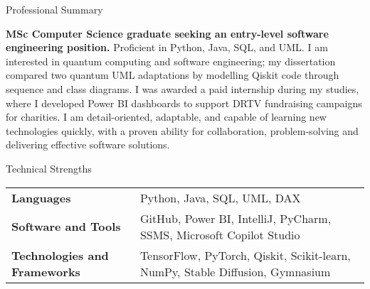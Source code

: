 \documentclass[
	11pt, %
]{resume} %
\begin{document}

\begin{rSection}{Professional Summary}

\textbf{MSc Computer Science graduate seeking an entry-level software engineering position.} Proficient in Python,
Java, SQL, and UML. I am interested in quantum computing and software engineering; my dissertation
compared two quantum UML adaptations by modelling Qiskit code through sequence and class diagrams. I was awarded a
paid internship during my studies, where I developed Power BI dashboards to support DRTV fundraising campaigns for
charities. I am detail-oriented, adaptable, and capable of learning new technologies quickly, with a proven ability
for collaboration, problem-solving and delivering effective software solutions.

\end{rSection}



\begin{rSection}{Technical Strengths}

    \begin{tabular}{@{} p{4cm} p{11cm} @{}}
        \textbf{Languages} & Python, Java, SQL, UML, DAX \\ 
        \textbf{Software and Tools} & GitHub, Power BI, IntelliJ, PyCharm, SSMS, Microsoft Copilot Studio \\ 
        \textbf{Technologies and Frameworks} & TensorFlow, PyTorch, Qiskit, Scikit-learn, NumPy, Stable Diffusion,
		Gymnasium\\
    \end{tabular}

\end{rSection}



\end{document}
